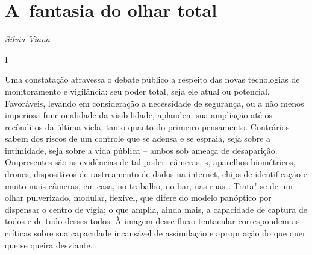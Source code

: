 \chapter{A~fantasia do olhar
total}\label{a-fantasia-do-olhar-total}

\begin{flushright}
\emph{Silvia Viana}
\end{flushright}

\begin{center}
I
\end{center}

Uma constatação atravessa o debate público a respeito das novas
tecnologias de monitoramento e vigilância: seu poder total, seja ele
atual ou potencial. Favoráveis, levando em consideração a necessidade de
segurança, ou a não menos imperiosa funcionalidade da visibilidade,
aplaudem sua ampliação até os recônditos da última viela, tanto quanto
do primeiro pensamento. Contrários sabem dos riscos de um controle que
se adensa e se espraia, seja sobre a intimidade, seja sobre a vida
pública -- ambos sob ameaça de desaparição. Onipresentes são as
evidências de tal poder: câmeras, s, aparelhos biométricos, drones,
dispositivos de rastreamento de dados na internet, chips de
identificação e muito mais câmeras, em casa, no trabalho, no bar, nas
ruas\ldots{} Trata"-se de um olhar pulverizado, modular, flexível, que difere
do modelo panóptico por dispensar o centro de vigia; o que amplia, ainda
mais, a capacidade de captura de todos e de tudo desses todos. À imagem
desse fluxo tentacular correspondem as críticas sobre sua capacidade
incansável de assimilação e apropriação do que quer que se queira
desviante.

